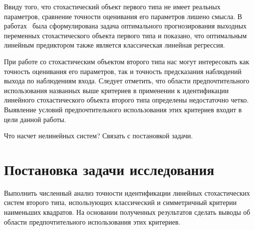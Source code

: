 Ввиду того, что стохастический объект первого типа не имеет реальных параметров,
сравнение точности оценивания его параметров лишено смысла.
В работах~\cite{mukha_2010, mukha_2011} была сформулирована задача оптимального прогнозирования
выходных переменных стохастического объекта первого типа и показано,
что оптимальным линейным предиктором также является классическая линейная регрессия.

При работе со стохастическим объектом второго типа нас могут интересовать как точность
оценивания его параметров, так и точность предсказания наблюдений выхода по наблюдениям входа.
Следует отметить, что области предпочтительного использования названных выше критериев в применении к
идентификации линейного стохастического объекта второго типа определены недостаточно четко.
Выявление условий предпочтительного использования этих критериев входит в цели данной работы.

{\color{red} Что насчет нелинейных систем?}
{\color{red} Связать с постановкой задачи.}

\section{Постановка задачи исследования}

Выполнить численный анализ точности идентификации линейных стохастических систем второго типа,
использующих классический и симметричный критерии наименьших квадратов.
На основании полученных результатов сделать выводы об области предпочтительного
использования этих критериев.


